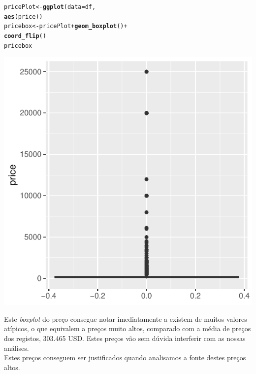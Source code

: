 \documentclass[a4paper, justified]{tufte-handout}\usepackage[]{graphicx}\usepackage[]{xcolor}
\makeatletter
\def\maxwidth{ %
  \ifdim\Gin@nat@width>\linewidth
    \linewidth
  \else
    \Gin@nat@width
  \fi
}
\newcommand{\hlopt}[1]{\textcolor[rgb]{0,0,0}{#1}}%
\newcommand{\hlstd}[1]{\textcolor[rgb]{0.345,0.345,0.345}{#1}}%
\newcommand{\hlkwb}[1]{\textcolor[rgb]{0.69,0.353,0.396}{#1}}%
\newcommand{\hlkwc}[1]{\textcolor[rgb]{0.333,0.667,0.333}{#1}}%
\newcommand{\hlkwd}[1]{\textcolor[rgb]{0.737,0.353,0.396}{\textbf{#1}}}%
\newenvironment{kframe}{%
 \def\at@end@of@kframe{}%
 \ifinner\ifhmode%
  \def\at@end@of@kframe{\end{minipage}}%
  \begin{minipage}{\columnwidth}%
 \fi\fi%
 \def\FrameCommand##1{\hskip\@totalleftmargin \hskip-\fboxsep
 \colorbox{shadecolor}{##1}\hskip-\fboxsep
     \hskip-\linewidth \hskip-\@totalleftmargin \hskip\columnwidth}%
 \MakeFramed {\advance\hsize-\width
   \@totalleftmargin\z@ \linewidth\hsize
   \@setminipage}}%
 {\par\unskip\endMakeFramed%
 \at@end@of@kframe}
\newenvironment{knitrout}{}{} %
\makeatother
\begin{document}
\begin{knitrout}
\color{fgcolor}\begin{kframe}
\begin{alltt}
\hlstd{pricePlot} \hlkwb{<-} \hlkwd{ggplot}\hlstd{(}\hlkwc{data} \hlstd{= df,}
    \hlkwd{aes}\hlstd{(price))}
\hlstd{pricebox} \hlkwb{<-} \hlstd{pricePlot} \hlopt{+} \hlkwd{geom_boxplot}\hlstd{()} \hlopt{+}
    \hlkwd{coord_flip}\hlstd{()}
\hlstd{pricebox}
\end{alltt}
\end{kframe}\begin{marginfigure}
\includegraphics[width=\maxwidth]{figure/chunk-priceBoxPlot-1} \end{marginfigure}

\end{knitrout}
Este \textit{boxplot} do preço consegue notar imediatamente a existem de muitos valores atípicos, o que equivalem a preços muito altos, comparado com a média de preços dos registos, 303.465 USD. Estes preços vão sem dúvida interferir com as nossas análises. \\
Estes preços conseguem ser justificados quando analisamos a fonte destes preços altos.
\end{document}
